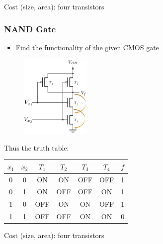 \documentclass[12pt,openany]{book}
\begin{document}
			      	Cost (size, area): four transistors
			      	
			      	\subsubsection{NAND Gate}
			      	\begin{itemize}
			      		\item Find the functionality of the given CMOS gate
			      	\end{itemize}
			      	      
			      	\begin{figure}[h]
			      		\centering
			      		\includegraphics[width=0.3\textwidth]{circuits/9.1.5_2.png} %
			      	\end{figure}
			      	      
			      	
			      	Thus the truth table: 
			      	\begin{center}
			      		\begin{tabular}{ |c|c||c|c|c|c||c| }
			      			\hline
			      			\( x_1 \) & \( x_2 \) & \( T_1 \) & \( T_2 \) & \( T_3 \) & \( T_4 \) & \( f \) \\
			      			\hline
			      			0         & 0         & ON        & ON        & OFF       & OFF       & 1       \\
			      			0         & 1         & ON        & OFF       & OFF       & ON        & 1       \\
			      			1         & 0         & OFF       & ON        & ON        & OFF       & 1       \\
			      			1         & 1         & OFF       & OFF       & ON        & ON        & 0       \\
			      			\hline
			      		\end{tabular}
			      	\end{center}
			      	      
			      	Cost (size, area): four transistors
			      	
\end{document}

